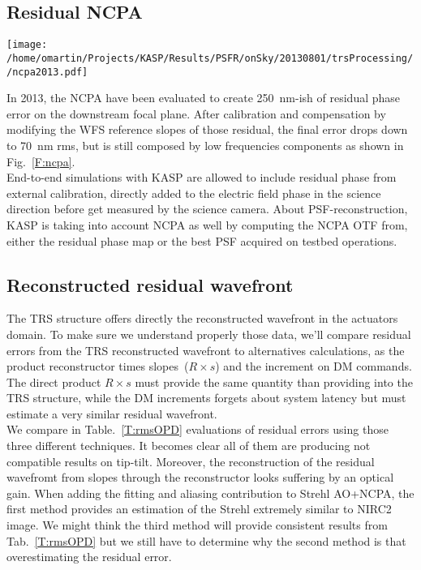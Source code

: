 \documentclass[12pt]{article}
\begin{document}
\subsection{Residual NCPA}

\begin{minipage}{0.4\columnwidth}
	\centering
		\texttt{[image: /home/omartin/Projects/KASP/Results/PSFR/onSky/20130801/trsProcessing//ncpa2013.pdf]}
		\label{F:ncpa}
\end{minipage}	
\hspace{.5cm}
\begin{minipage}{0.52\columnwidth}
In 2013, the NCPA have been evaluated to create 250~nm-ish of residual phase error on the downstream focal plane. After calibration and compensation by modifying the WFS reference slopes of those residual, the final error drops down to 70~nm rms, but is still composed by low frequencies components as shown in Fig.~\ref{F:ncpa}.\\

End-to-end simulations with KASP are allowed to include residual phase from external calibration, directly added to the electric field phase in the science direction before get measured by the science camera. About PSF-reconstruction, KASP is taking into account NCPA as well by computing the NCPA OTF from, either the residual phase map or the best PSF acquired on testbed operations.

\end{minipage}

\subsection{Reconstructed residual wavefront}

The TRS structure offers directly the reconstructed wavefront in the actuators domain. To make sure we understand properly those data, we'll compare residual errors from the TRS reconstructed wavefront to alternatives calculations, as the product reconstructor times slopes~($R\times s$) and the increment on DM commands. The direct product $R\times s$ must provide the same quantity than providing into the TRS structure, while the DM increments forgets about system latency but must estimate a very similar residual wavefront. \\

We compare in Table.~\ref{T:rmsOPD} evaluations of residual errors using those three different techniques. It becomes clear all of them are producing not compatible results on tip-tilt. Moreover, the reconstruction of the residual wavefromt from slopes through the reconstructor looks suffering by an optical gain. When adding the fitting and aliasing contribution to Strehl AO+NCPA, the first method provides an estimation of the Strehl extremely similar to NIRC2 image. We might think the third method will provide consistent results from Tab.~\ref{T:rmsOPD} but we still have to determine why the second method is that overestimating the residual error.
\end{document}
